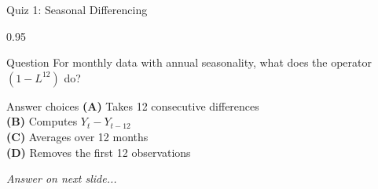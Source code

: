 \documentclass[9pt, aspectratio=169, t]{beamer}
\begin{document}
\begin{frame}{Quiz 1: Seasonal Differencing}
    \begin{cminipage}{0.95\textwidth}
    \begin{alertblock}{Question}
        For monthly data with annual seasonality, what does the operator $(1-L^{12})$ do?
    \end{alertblock}

    \vspace{0.4cm}

    \begin{block}{Answer choices}
        \textcolor{MainBlue}{\textbf{(A)}} Takes 12 consecutive differences\\[3pt]
        \textcolor{MainBlue}{\textbf{(B)}} Computes $Y_t - Y_{t-12}$\\[3pt]
        \textcolor{MainBlue}{\textbf{(C)}} Averages over 12 months\\[3pt]
        \textcolor{MainBlue}{\textbf{(D)}} Removes the first 12 observations
    \end{block}

    \vspace{0.5cm}

    \begin{center}
        \textit{Answer on next slide...}
    \end{center}
    \end{cminipage}
\end{frame}
\end{document}
